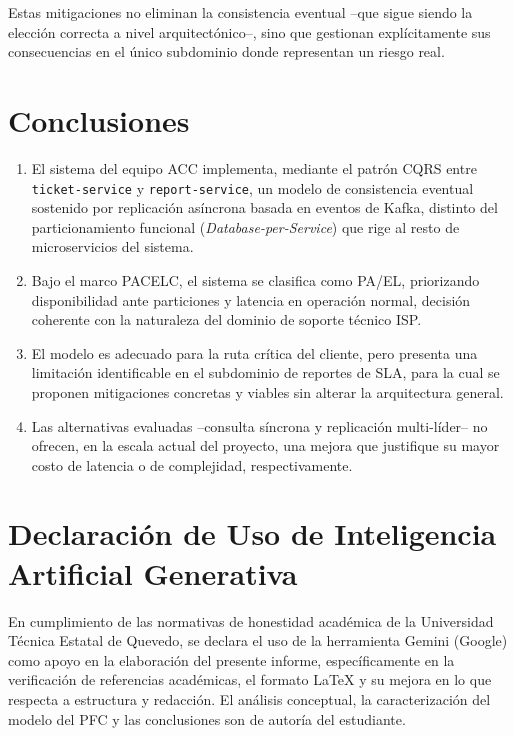 \documentclass[12pt, a4paper]{article}
\begin{document}
Estas mitigaciones no eliminan la consistencia eventual --que sigue siendo la elección correcta a nivel arquitectónico--, sino que gestionan explícitamente sus consecuencias en el único subdominio donde representan un riesgo real.

\newpage
\section{Conclusiones}
\begin{enumerate}
    \item El sistema del equipo ACC implementa, mediante el patrón CQRS entre \texttt{ticket-service} y \texttt{report-service}, un modelo de consistencia eventual sostenido por replicación asíncrona basada en eventos de Kafka, distinto del particionamiento funcional (\textit{Database-per-Service}) que rige al resto de microservicios del sistema.
    \item Bajo el marco PACELC, el sistema se clasifica como PA/EL, priorizando disponibilidad ante particiones y latencia en operación normal, decisión coherente con la naturaleza del dominio de soporte técnico ISP.
    \item El modelo es adecuado para la ruta crítica del cliente, pero presenta una limitación identificable en el subdominio de reportes de SLA, para la cual se proponen mitigaciones concretas y viables sin alterar la arquitectura general.
    \item Las alternativas evaluadas --consulta síncrona y replicación multi-líder-- no ofrecen, en la escala actual del proyecto, una mejora que justifique su mayor costo de latencia o de complejidad, respectivamente.
\end{enumerate}

\section*{Declaración de Uso de Inteligencia Artificial Generativa}
En cumplimiento de las normativas de honestidad académica de la Universidad Técnica Estatal de Quevedo, se declara el uso de la herramienta Gemini (Google) como apoyo en la elaboración del presente informe, específicamente en la verificación de referencias académicas, el formato LaTeX y su mejora en lo que respecta a estructura y redacción. El análisis conceptual, la caracterización del modelo del PFC y las conclusiones son de autoría del estudiante.

\clearpage
\printbibliography[title={Referencias}]
\end{document}
